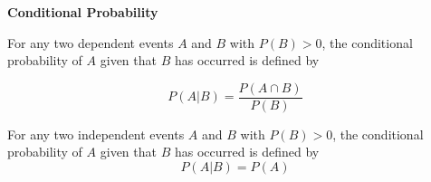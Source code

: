 \begin{center}
\textbf{Conditional Probability
}
\end{center}

\vspace*{1ex}

For any two dependent events $A$ and $B$ with $P(B) > 0$, the conditional probability of $A$ given that $B$ has occurred is defined by

\[
P(A|B) = \displaystyle \frac{P(A\cap B)}{P(B)} 
\] 

For any two independent events $A$ and $B$ with $P(B) > 0$, the conditional probability of $A$ given that $B$ has occurred is defined by
\[P(A | B) = P(A)\]

